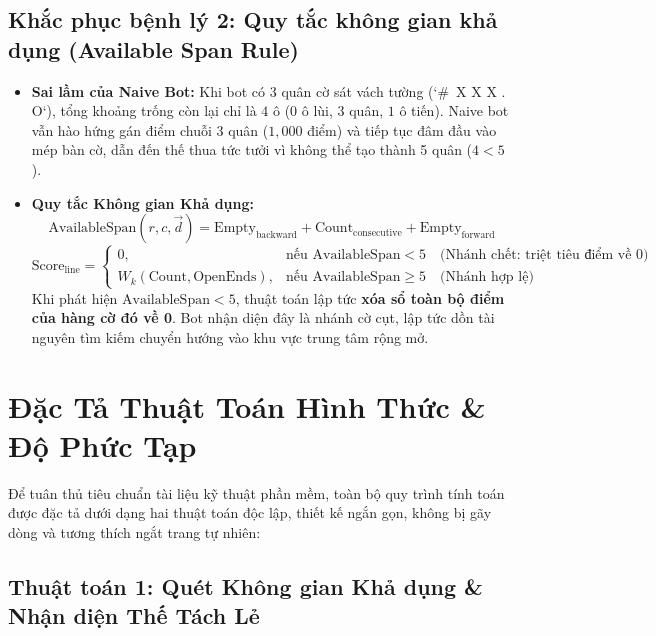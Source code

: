 \documentclass[11pt,a4paper]{article}
\begin{document}
\subsection{Khắc phục bệnh lý 2: Quy tắc không gian khả dụng (Available Span Rule)}
\begin{itemize}
    \item \textbf{Sai lầm của Naive Bot:} Khi bot có 3 quân cờ sát vách tường (`\#\ X X X . O`), tổng khoảng trống còn lại chỉ là $4$ ô ($0$ ô lùi, $3$ quân, $1$ ô tiến). Naive bot vẫn hào hứng gán điểm chuỗi 3 quân ($1{,}000$ điểm) và tiếp tục đâm đầu vào mép bàn cờ, dẫn đến thế thua tức tưởi vì không thể tạo thành 5 quân ($4 < 5$).
    \item \textbf{Quy tắc Không gian Khả dụng:}
    \begin{equation}
    \text{AvailableSpan}(r, c, \vec{d}) = \text{Empty}_{\text{backward}} + \text{Count}_{\text{consecutive}} + \text{Empty}_{\text{forward}}
    \end{equation}
    \begin{equation}
    \text{Score}_{\text{line}} = \begin{cases}
    0, & \text{nếu } \text{AvailableSpan} < 5 \quad \text{(Nhánh chết: triệt tiêu điểm về 0)} \\
    W_k(\text{Count}, \text{OpenEnds}), & \text{nếu } \text{AvailableSpan} \ge 5 \quad \text{(Nhánh hợp lệ)}
    \end{cases}
    \end{equation}
    Khi phát hiện $\text{AvailableSpan} < 5$, thuật toán lập tức \textbf{xóa sổ toàn bộ điểm của hàng cờ đó về 0}. Bot nhận diện đây là nhánh cờ cụt, lập tức dồn tài nguyên tìm kiếm chuyển hướng vào khu vực trung tâm rộng mở.
\end{itemize}

\section{Đặc Tả Thuật Toán Hình Thức \& Độ Phức Tạp}

Để tuân thủ tiêu chuẩn tài liệu kỹ thuật phần mềm, toàn bộ quy trình tính toán được đặc tả dưới dạng hai thuật toán độc lập, thiết kế ngắn gọn, không bị gãy dòng và tương thích ngắt trang tự nhiên:

\subsection{Thuật toán 1: Quét Không gian Khả dụng \& Nhận diện Thế Tách Lẻ}
\end{document}

